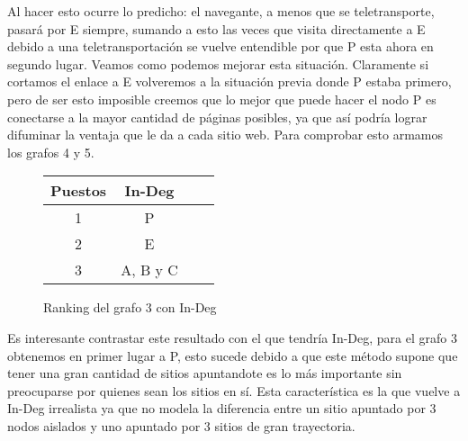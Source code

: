 Al hacer esto ocurre lo predicho: el navegante, a menos que se teletransporte, pasará por E siempre, sumando a esto las veces que visita directamente a E debido a una teletransportación se vuelve entendible por que P esta ahora en segundo lugar. Veamos como podemos mejorar esta situación. Claramente si cortamos el enlace a E volveremos a la situación previa donde P estaba primero, pero de ser esto imposible creemos que lo mejor que puede hacer el nodo P es conectarse a la mayor cantidad de páginas posibles, ya que así podría lograr difuminar la ventaja que le da a cada sitio web. Para comprobar esto armamos los grafos 4 y 5.

\begin{figure}[H]
\centering
\begin{tabular}{| c | c | c | c |}
  \hline
  Puestos & In-Deg\\ \hline \hline
  1 & P\\ \hline
  2 & E\\ \hline
  3 & A, B y C\\ \hline
\end{tabular}
  \caption{\footnotesize{Ranking del grafo 3 con In-Deg}}
  \label{fig:Rankings}
\end{figure}


Es interesante contrastar este resultado con el que tendría In-Deg, para el grafo 3 obtenemos en primer lugar a P, esto sucede debido a que este método supone que tener una gran cantidad de sitios apuntandote es lo más importante sin preocuparse por quienes sean los sitios en sí. Esta característica es la que vuelve a In-Deg irrealista ya que no modela la diferencia entre un sitio apuntado por 3 nodos aislados y uno apuntado por 3 sitios de gran trayectoria.

